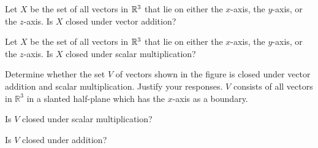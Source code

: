 \documentclass{ximera}
\begin{document}
 	\begin{problem}\label{pr:R^3axes1}  Let $X$ be the set of all vectors in $\mathbb{R}^3$ that lie on either the $x$-axis, the $y$-axis, or the $z$-axis. 
  Is $X$ closed under vector addition?
  
  \begin{multipleChoice}
 \end{multipleChoice}
 
 	\end{problem}
 	\begin{problem}\label{pr:R^3axes2}  Let $X$ be the set of all vectors in $\mathbb{R}^3$ that lie on either the $x$-axis, the $y$-axis, or the $z$-axis. 
 Is $X$ closed under scalar multiplication?
 
 \begin{multipleChoice}
 \end{multipleChoice}
 	\end{problem}
  
\begin{problem}\label{prob:closedmultchoice1} Determine whether the set $V$ of vectors shown in the figure is closed under vector addition and scalar multiplication.  Justify your responses.
$V$ consists of all vectors in $\mathbb{R}^3$ in a slanted half-plane which has the $x$-axis as a boundary.


Is $V$ closed under scalar multiplication?
 
 \begin{multipleChoice}
 \end{multipleChoice}
 
 Is $V$ closed under addition?
 
 \begin{multipleChoice}
 \end{multipleChoice}
\end{problem}
\end{document}
